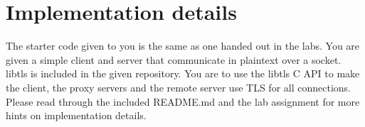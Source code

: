 \documentclass[11pt]{article}
\begin{document}

\section{Implementation details}
The starter code given to you is the same as one handed out in the labs. You are given a simple client and server that communicate in plaintext over a socket. libtls is included in the given repository. You are to use the libtls C API to make the client, the proxy servers and the remote server use TLS for all connections. Please read through the included README.md and the lab assignment for more hints on implementation details.

\end{document}
